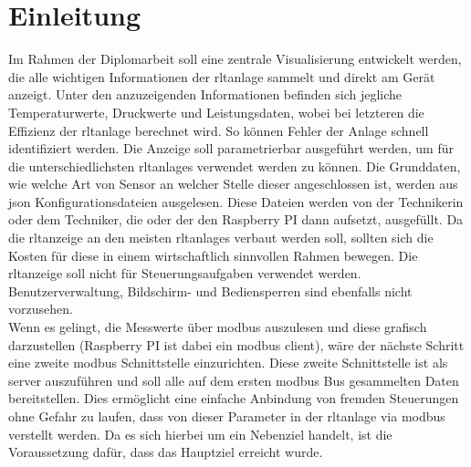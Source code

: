 \chapter{Einleitung} 
\label{aufgabenstellung}
\noindent Im Rahmen der Diplomarbeit soll eine zentrale Visualisierung entwickelt werden, die alle wichtigen Informationen der \ac{rltanlage} sammelt und direkt am Gerät anzeigt. Unter den anzuzeigenden Informationen befinden sich jegliche Temperaturwerte, Druckwerte und Leistungsdaten, wobei bei letzteren die Effizienz der \ac{rltanlage} berechnet wird. So können Fehler der Anlage schnell identifiziert werden. 
Die Anzeige soll parametrierbar ausgeführt werden, um für die unterschiedlichsten 
\acp{rltanlage} verwendet werden zu können. Die Grunddaten, wie \zB welche Art von 
Sensor \bzw an welcher Stelle dieser angeschlossen ist, werden aus \ac{json} Konfigurationsdateien ausgelesen. Diese Dateien werden von der Technikerin oder dem Techniker, die oder der den Raspberry PI dann aufsetzt, ausgefüllt.
Da die \ac{rltanzeige} an den meisten \acp{rltanlage} verbaut werden soll, sollten sich die Kosten für diese in einem wirtschaftlich sinnvollen Rahmen bewegen.
Die \ac{rltanzeige} soll nicht für Steuerungsaufgaben verwendet werden. Benutzerverwaltung, 
Bildschirm- und Bediensperren sind ebenfalls nicht vorzusehen. \\

Wenn es gelingt, die Messwerte über \gls{modbus} auszulesen und diese grafisch darzustellen (Raspberry PI ist dabei ein \gls{modbus} \gls{client}), wäre der nächste Schritt eine zweite \gls{modbus} Schnittstelle einzurichten. Diese zweite Schnittstelle ist als \gls{server} auszuführen und soll alle auf dem ersten \gls{modbus} Bus gesammelten Daten bereitstellen. Dies ermöglicht eine einfache Anbindung von fremden Steuerungen ohne Gefahr zu laufen, dass von dieser Parameter in der \ac{rltanlage} via \gls{modbus} verstellt werden. Da es sich hierbei um ein Nebenziel handelt, ist die Voraussetzung dafür, dass das Hauptziel erreicht wurde.

